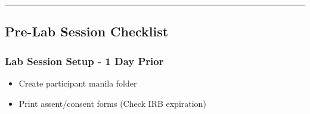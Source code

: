 \documentclass[]{book}
\providecommand{\tightlist}{%
  \setlength{\itemsep}{0pt}\setlength{\parskip}{0pt}}
\begin{document}
\begin{center}\rule{0.5\linewidth}{0.5pt}\end{center}

\hypertarget{pre-lab-session-checklist}{%
\subsection{Pre-Lab Session Checklist}\label{pre-lab-session-checklist}}

\hypertarget{lab-session-setup---1-day-prior}{%
\subsubsection{Lab Session Setup - 1 Day Prior}\label{lab-session-setup---1-day-prior}}

\begin{itemize}
\tightlist
\item
  Create participant manila folder
\item
  Print assent/consent forms (Check IRB expiration)


\end{itemize}
\end{document}
